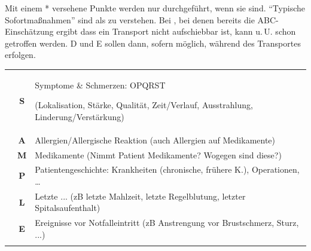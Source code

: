 {\begin{minipage}[t]{\linewidth -
{2\fboxrule} - {2\fboxsep}}
\begin{minipage}[t]{\linewidth}
{\begin{center}
{\tiny Mit einem * versehene Punkte werden nur durchgeführt,
wenn sie  sind. \enquote{Typische
Sofortmaßnahmen} sind als  zu verstehen.
Bei , bei denen bereits die 
ABC-Einschätzung ergibt dass ein Transport nicht aufschiebbar ist, 
kann u.\,U. schon  getroffen werden. 
D und E sollen dann, sofern möglich, während des 
Transportes erfolgen. }
\end{center}
}
\end{minipage}
\end{minipage}\vspace{-\baselineskip}
}
{}

\vfill
\restoregeometry\pagestyle{fancy}

{}
{}
{%
\begin{minipage}{\linewidth}
\FontTableBase\footnotesize
{\sffamily\FontTableBase\footnotesize\CorrectionItemizeBox\renewcommand{\itemhook}{%
  \setlength{\itemsep}{0.005\baselineskip}
  \setlength{\leftmargin}{1.4em}
  \setlength{\labelwidth}{0.9em}
}
\begin{tabulary}{\linewidth}[H]{lCL}
\toprule\addlinespace
{}
 &
{\sffamily\textbf S}
 &
Symptome {\&} Schmerzen: OPQRST

{\tiny(Lokalisation, Stärke,  Qualität, Zeit/Verlauf, 
 Ausstrahlung, Linderung/Verstärkung)}
\\\addlinespace
 &
{\sffamily\textbf A}
 &
Allergien/Allergische Reaktion (auch
Allergien auf Medikamente)
\\\addlinespace
 &
 {\sffamily\textbf M}
 &
Medikamente {\tiny(Nimmt Patient Medikamente?
Wogegen sind diese?)}
\\\addlinespace
 &
{\sffamily\textbf P}
 &
Patientengeschichte: Krankheiten {\tiny(chronische, frühere
K.)}, Operationen, \ldots 
\\\addlinespace
 &
 {\sffamily\textbf L}
 &
Letzte ... (zB letzte Mahlzeit, letzte
Regelblutung, letzter Spitalsaufenthalt)
\\\addlinespace
 &
 {\sffamily\textbf E}
 &
Ereignisse vor Notfalleintritt {\tiny(zB
Anstrengung vor Brustschmerz, Sturz, ...)}
\\\addlinespace\midrule\addlinespace


\end{tabulary}}
\end{minipage}}
